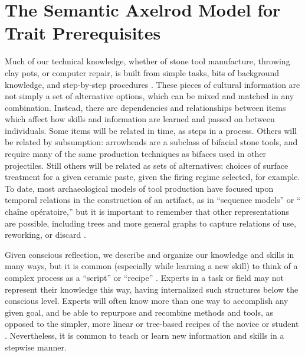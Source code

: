 \section{The Semantic Axelrod Model for Trait
Prerequisites}\label{the-semantic-axelrod-model-for-trait-prerequisites}

Much of our technical knowledge, whether of stone tool manufacture,
throwing clay pots, or computer repair, is built from simple tasks, bits
of background knowledge, and step-by-step procedures
\citep{neff1992ceramics, schiffer1987theory}. These pieces of cultural
information are not simply a set of alternative options, which can be
mixed and matched in any combination. Instead, there are dependencies
and relationships between items which affect how skills and information
are learned and passed on between individuals. Some items will be
related in time, as steps in a process. Others will be related by
subsumption: arrowheads are a subclass of bifacial stone tools, and
require many of the same production techniques as bifaces used in other
projectiles. Still others will be related as sets of alternatives:
choices of surface treatment for a given ceramic paste, given the firing
regime selected, for example. To date, most archaeological models of
tool production have focused upon temporal relations in the construction
of an artifact, as in ``sequence models'' or
``$\textrm{cha\^ine op\'eratoire}$,'' but it is important to remember
that other representations are possible, including trees and more
general graphs to capture relations of use, reworking, or discard
\citep{Bamforth:2008kq, Bleed:2008in, Ferguson:2008ce, Hogberg:2008fj, bleed2001trees, bleed2002obviously, schiffer1987theory, stout2002skill}.

Given conscious reflection, we describe and organize our knowledge and
skills in many ways, but it is common (especially while learning a new
skill) to think of a complex process as a ``script'' or ``recipe''
\citep{schank1977scripts}. Experts in a task or field may not represent
their knowledge this way, having internalized such structures below the
conscious level. Experts will often know more than one way to accomplish
any given goal, and be able to repurpose and recombine methods and
tools, as opposed to the simpler, more linear or tree-based recipes of
the novice or student
\citep[e.g.,][]{Bleed:2008in, bleed2002obviously, stout2002skill}.
Nevertheless, it is common to teach or learn new information and skills
in a stepwise manner.


